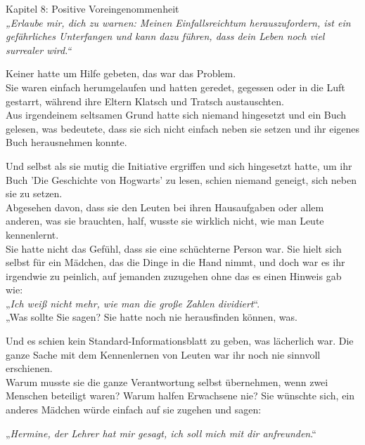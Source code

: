 

\hypertarget{positive-voreingenommenheit}{%

Kapitel 8: Positive Voreingenommenheit\\ \emph{\hfill\break „Erlaube mir, dich zu warnen: Meinen Einfallsreichtum herauszufordern, ist ein gefährliches Unterfangen und kann dazu führen, dass dein Leben noch viel surrealer wird.“}

Keiner hatte um Hilfe gebeten, das war das Problem.\\ Sie waren einfach herumgelaufen und hatten geredet, gegessen oder in die Luft gestarrt, während ihre Eltern Klatsch und Tratsch austauschten.\\ Aus irgendeinem seltsamen Grund hatte sich niemand hingesetzt und ein Buch gelesen, was bedeutete, dass sie sich nicht einfach neben sie setzen und ihr eigenes Buch herausnehmen konnte.

Und selbst als sie mutig die Initiative ergriffen und sich hingesetzt hatte, um ihr Buch 'Die Geschichte von Hogwarts' zu lesen, schien niemand geneigt, sich neben sie zu setzen.\\ Abgesehen davon, dass sie den Leuten bei ihren Hausaufgaben oder allem anderen, was sie brauchten, half, wusste sie wirklich nicht, wie man Leute kennenlernt.\\ Sie hatte nicht das Gefühl, dass sie eine schüchterne Person war. Sie hielt sich selbst für ein Mädchen, das die Dinge in die Hand nimmt, und doch war es ihr irgendwie zu peinlich, auf jemanden zuzugehen ohne das es einen Hinweis gab wie:\\ „\emph{Ich weiß nicht mehr, wie man die große Zahlen dividiert}“.\\ „Was sollte Sie sagen? Sie hatte noch nie herausfinden können, was.

Und es schien kein Standard-Informationsblatt zu geben, was lächerlich war. Die ganze Sache mit dem Kennenlernen von Leuten war ihr noch nie sinnvoll erschienen.\\ Warum musste sie die ganze Verantwortung selbst übernehmen, wenn zwei Menschen beteiligt waren? Warum halfen Erwachsene nie? Sie wünschte sich, ein anderes Mädchen würde einfach auf sie zugehen und sagen:

„\emph{Hermine, der Lehrer hat mir gesagt, ich soll mich mit dir anfreunden}.“

}
